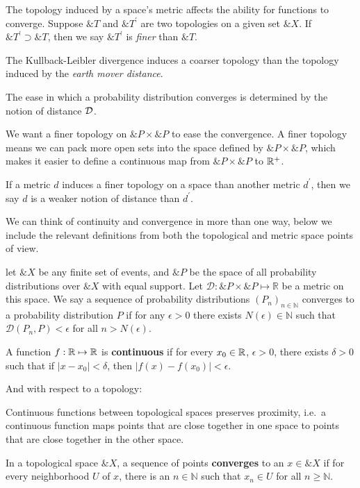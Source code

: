 The topology induced by a space's metric affects the ability for
functions to converge. Suppose $\&T$ and $\&T^\prime$ are two
topologies on a given set $\&X$. If $\&T^\prime \supset \&T$, then we
say $\&T^\prime$ is \textit{finer} than $\&T$.

The Kullback-Leibler divergence induces a coarser topology than the
topology induced by the \textit{earth mover distance}.

The ease in which a probability distribution converges is determined
by the notion of distance $\mathcal{D}_{\text{\tiny}}$.

We want a finer topology on $\&P \times \&P$ to ease the convergence.
A finer topology means we can pack more open sets into the space
defined by $\&P \times \&P$, which makes it easier to define a
continuous map from $\&P \times \&P$ to $\mathbb{R}^+$.

If a metric $d$ induces a finer topology on a space than another
metric $d^\prime$, then we say $d$ is a weaker notion of distance than
$d^\prime$.

We can think of continuity and convergence in more than one way, below
we include the relevant definitions from both the topological and
metric space points of view.

\begin{definition}
  let $\&X$ be any finite set of events, and $\&P$ be the space of all
  probability distributions over $\&X$ with equal support. Let
  $\mathcal{D}: \&P \times \&P \mapsto \mathbb{R}$ be a metric on this
  space. We say a sequence of probability distributions
  $(P_n)_{n \in \mathbb{N}}$ converges to a probability distribution
  $P$ if for any $\epsilon > 0$ there exists
  $N(\epsilon) \in \mathbb{N}$ such that
  $\mathcal{D}(P_n,P) < \epsilon$ for all $n > N(\epsilon)$.
\end{definition}

\begin{definition}
  A function $f: \mathbb{R} \mapsto \mathbb{R}$ is \textbf{continuous} if for every
  $x_0 \in \mathbb{R}$, $\epsilon > 0$, there exists $\delta > 0$ such that if
  $|x - x_0| < \delta$, then $|f(x) - f(x_0)| < \epsilon$.
\end{definition}

And with respect to a topology:

Continuous functions between topological spaces preserves proximity,
i.e.\ a continuous function maps points that are close together in one
space to points that are close together in the other space.

\begin{definition}
  In a topological space $\&X$, a sequence of points
  \textbf{converges} to an $x \in \&X$ if for every neighborhood $U$
  of $x$, there is an $n \in \mathbb{N}$ such that $x_n \in U$ for all
  $n \geq \mathbb{N}$.
\end{definition}

